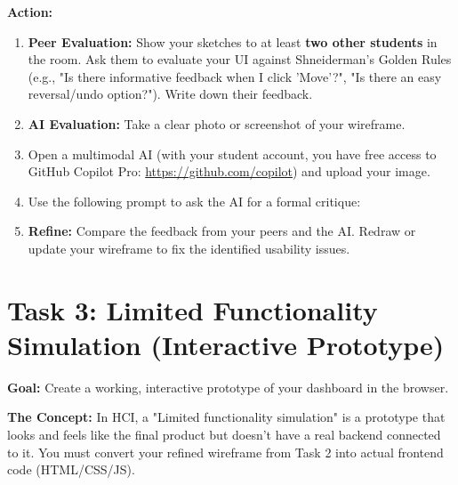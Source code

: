 \documentclass[a4paper,12pt]{article}
\begin{document}
\vspace{0.3cm}
\textbf{Action:}
\begin{enumerate}
    \item \textbf{Peer Evaluation:} Show your sketches to at least \textbf{two other students} in the room. Ask them to evaluate your UI against Shneiderman's Golden Rules (e.g., "Is there informative feedback when I click 'Move'?", "Is there an easy reversal/undo option?"). Write down their feedback.
    \item \textbf{AI Evaluation:} Take a clear photo or screenshot of your wireframe.
    \item Open a multimodal AI (with your student account, you have free access to GitHub Copilot Pro: \href{https://github.com/copilot}{https://github.com/copilot})  and upload your image.
    \item Use the following prompt to ask the AI for a formal critique:
    \begin{center}
    \end{center}
    \item \textbf{Refine:} Compare the feedback from your peers and the AI. Redraw or update your wireframe to fix the identified usability issues.
\end{enumerate}


\section*{Task 3: Limited Functionality Simulation (Interactive Prototype)}

\textbf{Goal:} Create a working, interactive prototype of your dashboard in the browser.

\textbf{The Concept:} In HCI, a "Limited functionality simulation" is a prototype that looks and feels like the final product but doesn't have a real backend connected to it. You must convert your refined wireframe from Task 2 into actual frontend code (HTML/CSS/JS). 
\end{document}
